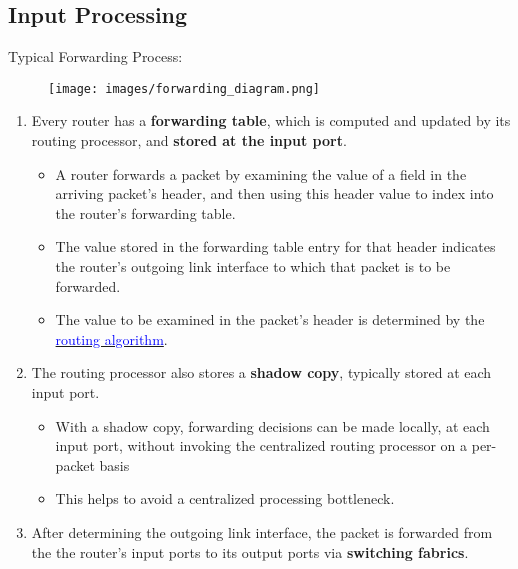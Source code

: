 \documentclass[a4paper]{article}
\begin{document}
\subsection{Input Processing}
Typical Forwarding Process:
\begin{figure}[H]
    \centering
    \texttt{[image: images/forwarding\_diagram.png]}
\end{figure}
\begin{enumerate}
    \item Every router has a \textbf{forwarding table}, which is computed and updated by its routing processor, and \textbf{stored at the input port}.
    \begin{itemize}[label=$\circ$]
        \item A router forwards a packet by examining the value of a field in the arriving packet’s header, and then using this header value to index into the router’s forwarding table.
        \item The value stored in the forwarding table entry for that header indicates the router’s outgoing link interface to which that packet is to be forwarded.
        \item The value to be examined in the packet's header is determined by the \hyperref[routealgo]{\textcolor{blue}{routing algorithm}}.
    \end{itemize}
    \newpage
    \item The routing processor also stores a \textbf{shadow copy}, typically stored at each input port.
    \begin{itemize}[label=$\circ$]
        \item With a shadow copy, forwarding decisions can be made locally, at each input port, without invoking the centralized routing processor on a per-packet basis
        \item This helps to avoid a centralized processing bottleneck.
    \end{itemize}
    \item After determining the outgoing link interface, the packet is forwarded from the the router's input ports to its output ports via \textbf{switching fabrics}.
\end{enumerate}
\end{document}
